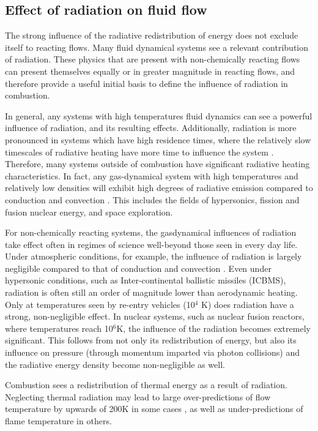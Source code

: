 \subsection{Effect of radiation on fluid flow}
The strong influence of the radiative redistribution of energy does not exclude itself to reacting flows. Many fluid dynamical systems see a relevant contribution of radiation. These physics that are present with non-chemically reacting flows can present themselves equally or in greater magnitude in reacting flows, and therefore provide a useful initial basis to define the influence of radiation in combustion. 

In general, any systems with high temperatures fluid dynamics can see a powerful influence of radiation, and its resulting effects. 
Additionally, radiation is more pronounced in systems which have high residence times, where the relatively slow timescales of radiative heating have more time to influence the system \cite{Wu2021LimitationsFires}. 
Therefore, many systems outside of combustion have significant radiative heating characteristics. In fact, any gas-dynamical system with high temperatures and relatively low densities will exhibit high degrees of radiative emission compared to conduction and convection \cite{Pai1966RadiationDynamics}. This includes the fields of hypersonics, fission and fusion nuclear energy, and space exploration.

For non-chemically reacting systems, the gasdynamical influences of radiation take effect often in regimes of science well-beyond those seen in every day life. Under atmospheric conditions, for example, the influence of radiation is largely negligible compared to that of conduction and convection \cite{Pai1966RadiationDynamics}.
Even under hypersonic conditions, such as Inter-continental ballistic missiles (ICBMS), radiation is often still an order of magnitude lower than aerodynamic heating. Only at temperatures seen by re-entry vehicles (10$^4$ K) does radiation have a strong, non-negligible effect.
In nuclear systems, such as nuclear fusion reactors, where temperatures reach 10$^6$K, the influence of the radiation becomes extremely significant. This follows from not only its redistribution of energy, but also its influence on pressure (through momentum imparted via photon collisions) and the radiative energy density become non-negligible as well. 


Combustion sees a redistribution of thermal energy as a result of radiation. 
Neglecting thermal radiation may lead to large over-predictions of flow temperature by upwards of 200K in some cases \cite{Modest2016RadiativeSystems,Wu2021LimitationsFires,Coelho2018RadiativeSystems}, as well as under-predictions of flame temperature in others.



